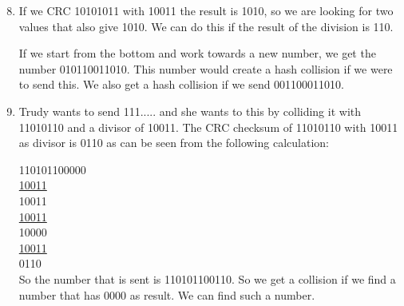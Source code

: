 \begin{enumerate}
\setcounter{enumi}{7}
\item If we CRC 10101011 with 10011 the result is 1010, so we are looking for two values that also give 1010. We can do this if the result of the division is 110. 

If we start from the bottom and work towards a new number, we get the number 010110011010. This number would create a hash collision if we were to send this. We also get a hash collision if we send 001100011010. 

\item Trudy wants to send 111..... and she wants to this by colliding it with 11010110 and a divisor of 10011. The CRC checksum of 11010110 with 10011 as divisor is 0110 as can be seen from the following calculation:

110101100000\\
\underline{10011}\\
\phantom{1}10011\\
\phantom{1}\underline{10011}\\
\phantom{111111}10000\\
\phantom{111111}\underline{10011}\\
\phantom{11111111}0110\\

So the number that is sent is 110101100110. So we get a collision if we find a number that has 0000 as result. We can find such a number. 
\end{enumerate}